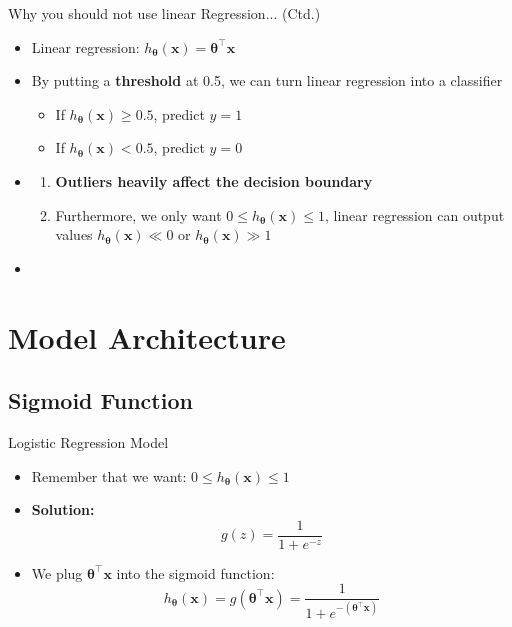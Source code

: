 \begin{frame}{Why you should not use linear Regression... (Ctd.)}{}
	\begin{itemize}
		\item Linear regression: $h_{\bm{\theta}}(\bm{x}) = \bm{\theta}^{\intercal} \bm{x}$
		\item By putting a \textbf{threshold} at 0.5, we can turn linear regression into a classifier
		\begin{itemize}
			\item If $h_{\bm{\theta}}(\bm{x}) \ge 0.5$, predict $y = 1$
			\item If $h_{\bm{\theta}}(\bm{x}) < 0.5$, predict $y = 0$
		\end{itemize}
		\item {}
		\begin{enumerate}
			\item \textbf{Outliers heavily affect the decision boundary}
			\item Furthermore, we only want $0 \le h_{\bm{\theta}}(\bm{x}) \le 1$,
				linear regression can output values $h_{\bm{\theta}}(\bm{x}) \ll 0$ or $h_{\bm{\theta}}(\bm{x}) \gg 1$
		\end{enumerate}
		\item {}
	\end{itemize}
\end{frame}


\section{Model Architecture}

\subsection{Sigmoid Function}

\begin{frame}{Logistic Regression Model}{}\important
	\begin{itemize}
		\item Remember that we want: $0 \le h_{\bm{\theta}}(\bm{x}) \le 1$
		\item \textbf{Solution:} 
		\begin{equation}
			g(z) = \frac{1}{1 + e^{-z}}
		\end{equation}
		\item We plug $\bm{\theta}^{\intercal} \bm{\bm{x}}$ into the sigmoid function:
		\begin{equation}
			h_{\bm{\theta}}(\bm{x}) = g(\bm{\theta}^{\intercal} \bm{\bm{x}}) = \frac{1}{1 + e^{-(\bm{\theta}^{\intercal} \bm{x})}}
		\end{equation}
	\end{itemize}
\end{frame}


